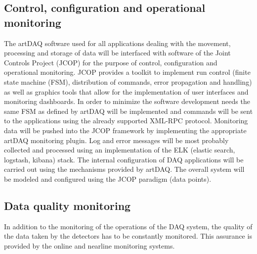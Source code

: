\subsection{Control, configuration and operational monitoring}
The artDAQ software used for all applications dealing with the movement,
processing and storage of data will be interfaced with software of the
Joint Controls Project (JCOP) for the purpose of control, configuration
and operational monitoring.  JCOP provides a toolkit to implement run
control (finite state machine (FSM), distribution of commands, error
propagation and handling) as well as graphics tools that allow for the
implementation of user interfaces and monitoring dashboards.  In order to
minimize the software development needs the same FSM as defined by artDAQ
will be implemented and commands will be sent to the applications using
the already supported XML-RPC protocol.  Monitoring data will be pushed
into the JCOP framework by implementing the appropriate artDAQ monitoring
plugin.  Log and error messages will be most probably collected and
processed using an implementation of the ELK (elastic search, logstash,
kibana) stack.  The internal configuration of DAQ applications will be
carried out using the mechanisms provided by artDAQ. The overall system
will be modeled and configured using the JCOP paradigm (data points).



\subsection{Data quality monitoring}

In addition to the monitoring of the operations of the DAQ system, the
quality of the data taken by the detectors has to be constantly monitored.
This assurance is provided by the online and nearline monitoring systems.

